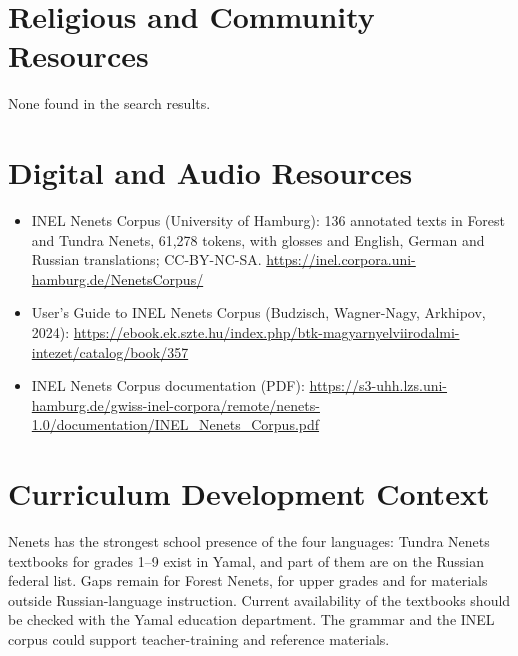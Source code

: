 \documentclass[12pt]{article}
\begin{document}
\section{Religious and Community Resources}
None found in the search results.

\section{Digital and Audio Resources}
\begin{itemize}
\item INEL Nenets Corpus (University of Hamburg): 136 annotated texts in Forest and Tundra Nenets, 61,278 tokens, with glosses and English, German and Russian translations; CC-BY-NC-SA. \url{https://inel.corpora.uni-hamburg.de/NenetsCorpus/}
\item User's Guide to INEL Nenets Corpus (Budzisch, Wagner-Nagy, Arkhipov, 2024): \url{https://ebook.ek.szte.hu/index.php/btk-magyarnyelviirodalmi-intezet/catalog/book/357}
\item INEL Nenets Corpus documentation (PDF): \url{https://s3-uhh.lzs.uni-hamburg.de/gwiss-inel-corpora/remote/nenets-1.0/documentation/INEL_Nenets_Corpus.pdf}
\end{itemize}

\section{Curriculum Development Context}
Nenets has the strongest school presence of the four languages: Tundra Nenets textbooks for grades 1--9 exist in Yamal, and part of them are on the Russian federal list. Gaps remain for Forest Nenets, for upper grades and for materials outside Russian-language instruction. Current availability of the textbooks should be checked with the Yamal education department. The grammar and the INEL corpus could support teacher-training and reference materials.
\end{document}
